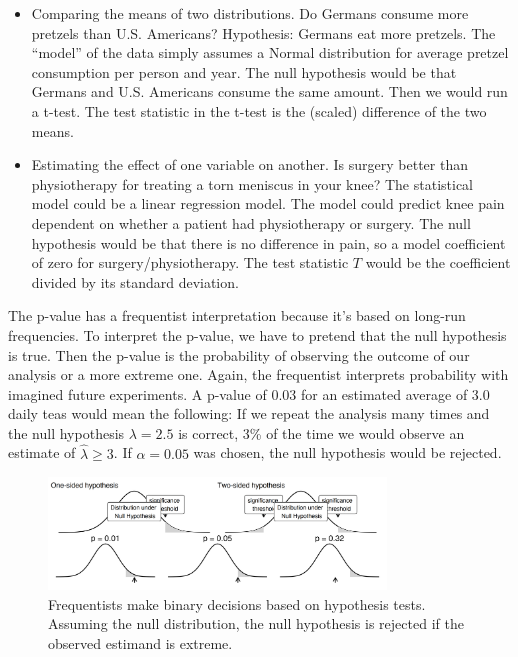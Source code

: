 \documentclass[
  10pt,
]{scrbook}
\providecommand{\tightlist}{%
  \setlength{\itemsep}{0pt}\setlength{\parskip}{0pt}}
\begin{document}
\begin{itemize}
\tightlist
\item
  Comparing the means of two distributions. Do Germans consume more pretzels than U.S. Americans? Hypothesis: Germans eat more pretzels. The ``model'' of the data simply assumes a Normal distribution for average pretzel consumption per person and year. The null hypothesis would be that Germans and U.S. Americans consume the same amount. Then we would run a t-test. The test statistic in the t-test is the (scaled) difference of the two means.
\item
  Estimating the effect of one variable on another. Is surgery better than physiotherapy for treating a torn meniscus in your knee? The statistical model could be a linear regression model. The model could predict knee pain dependent on whether a patient had physiotherapy or surgery. The null hypothesis would be that there is no difference in pain, so a model coefficient of zero for surgery/physiotherapy. The test statistic \(T\) would be the coefficient divided by its standard deviation.
\end{itemize}

The p-value has a frequentist interpretation because it's based on long-run frequencies.
To interpret the p-value, we have to pretend that the null hypothesis is true.
Then the p-value is the probability of observing the outcome of our analysis or a more extreme one.
Again, the frequentist interprets probability with imagined future experiments.
A p-value of 0.03 for an estimated average of 3.0 daily teas would mean the following:
If we repeat the analysis many times and the null hypothesis \(\lambda = 2.5\) is correct, 3\% of the time we would observe an estimate of \(\hat{\lambda} \geq 3\).
If \(\alpha = 0.05\) was chosen, the null hypothesis would be rejected.

\begin{figure}

{\centering \includegraphics[width=0.8\textwidth]{figures/hypothesis-1} 

}

\caption{Frequentists make binary decisions based on hypothesis tests. Assuming the null distribution, the null hypothesis is rejected if the observed estimand is extreme.}\label{fig:hypothesis}
\end{figure}
\end{document}
